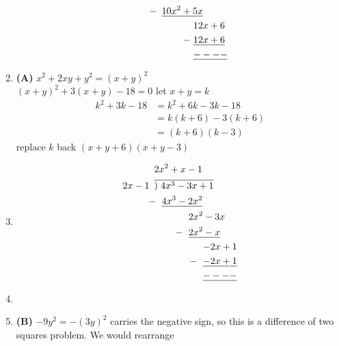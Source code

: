 \begin{multicols}{2}
\begin{enumerate}[label={\textbf{\arabic*.}}]
\begin{align*}
            - \hspace{-25pt} & \hspace{30pt} \underline{10x^2 + 5x} \\
            & \hspace{63pt} 12x + 6 \\
            - \hspace{-60pt} & \hspace{63pt} \underline{12x + 6} \\
            & \hspace{63pt} \underline{----}
        \end{align*}    
\item \textbf{(A)} \( x^2 + 2xy + y^2 = (x+y)^2 \) \\
    \( (x+y)^2 + 3(x+y) - 18 = 0 \) let \( x+y = k \) 
    \begin{align*}
    k^2 + 3k - 18 &= k^2 + 6k - 3k - 18 \\
    &= k(k+6) - 3(k+6) \\
    &= (k+6)(k-3)
    \end{align*}
    replace \( k \) back \( (x+y+6)(x+y-3) \)
\item 
    \begin{align*}
        & 2x^2 + x - 1  \\
        2x - 1 \hspace{5pt} & \overline{)\hspace{3pt} 4x^3 - 3x + 1} \\
        -\hspace{-2pt} & \hspace{8pt} \underline{4x^3 - 2x^2} \\
        & \hspace{36pt} 2x^2 - 3x \\
        -\hspace{-30pt} & \hspace{36pt} \underline{2x^2 - x} \\
        & \hspace{51pt} {-2x + 1} \\
        -\hspace{-45pt} & \hspace{51pt} \underline{-2x + 1} \\
        & \hspace{51pt} \underline{----}
    \end{align*}
\item
\item \textbf{(B)} \( -9y^2 = -(3y)^2 \) carries the negative sign, so this is a difference of two squares problem. We would rearrange

\end{enumerate}
\end{multicols}
